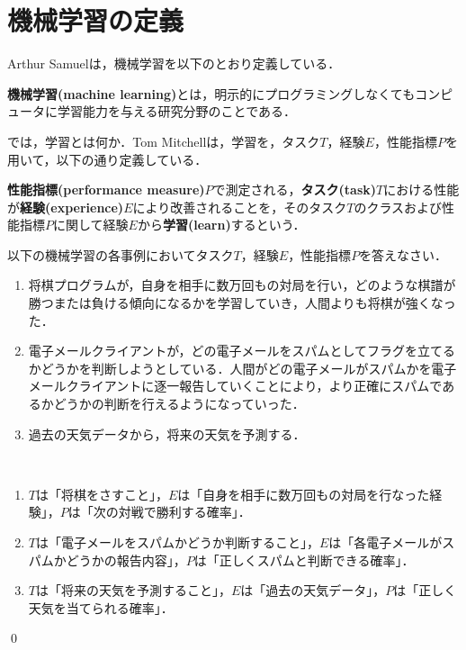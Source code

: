 \section{機械学習の定義}

Arthur Samuelは，機械学習を以下のとおり定義している．
\begin{defi}
{\bf 機械学習(machine learning)}とは，明示的にプログラミングしなくてもコンピュータに学習能力を与える研究分野のことである．
\end{defi}

では，学習とは何か．Tom Mitchellは，学習を，タスク$T$，経験$E$，性能指標$P$を用いて，以下の通り定義している．
\begin{defi}
{\bf 性能指標(performance measure)}$P$で測定される，{\bf タスク(task)}$T$における性能が{\bf 経験(experience)}$E$により改善されることを，そのタスク$T$のクラスおよび性能指標$P$に関して経験$E$から{\bf 学習(learn)}するという．
\end{defi}

\begin{qu}
以下の機械学習の各事例においてタスク$T$，経験$E$，性能指標$P$を答えなさい．
\begin{enumerate}
	\item 将棋プログラムが，自身を相手に数万回もの対局を行い，どのような棋譜が勝つまたは負ける傾向になるかを学習していき，人間よりも将棋が強くなった．
	\item 電子メールクライアントが，どの電子メールをスパムとしてフラグを立てるかどうかを判断しようとしている．人間がどの電子メールがスパムかを電子メールクライアントに逐一報告していくことにより，より正確にスパムであるかどうかの判断を行えるようになっていった．
	\item 過去の天気データから，将来の天気を予測する．
\end{enumerate}	
\end{qu}
\begin{ans}　
\begin{enumerate}
	\item $T$は「将棋をさすこと」，$E$は「自身を相手に数万回もの対局を行なった経験」，$P$は「次の対戦で勝利する確率」．
	\item $T$は「電子メールをスパムかどうか判断すること」，$E$は「各電子メールがスパムかどうかの報告内容」，$P$は「正しくスパムと判断できる確率」．
	\item $T$は「将来の天気を予測すること」，$E$は「過去の天気データ」，$P$は「正しく天気を当てられる確率」．
\end{enumerate}
\qed
\end{ans}

